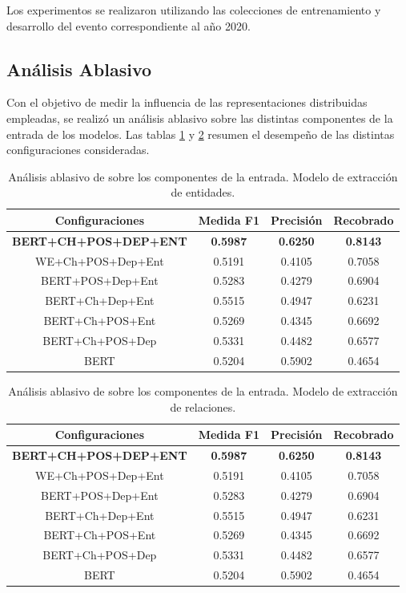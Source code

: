 Los experimentos se realizaron utilizando las colecciones de entrenamiento y desarrollo del evento correspondiente al año 2020.


\subsection{Análisis Ablasivo}

Con el objetivo de medir la influencia de las representaciones distribuidas empleadas, se realizó un análisis ablasivo sobre las distintas componentes de la entrada de los modelos.
Las tablas \ref{table:ablation_entities} y \ref{table:ablation_relations} resumen el desempeño de las distintas configuraciones consideradas.

\begin{table}[tb!]\centering	
	\begin{tabular}{|c|c|c|c|}
		\hline
		\textbf{Configuraciones} &  \textbf{Medida F1} & \textbf{Precisión} & \textbf{Recobrado} \\
		\hline
		\textbf{BERT+CH+POS+DEP+ENT} & \textbf{0.5987} & \textbf{0.6250} & \textbf{0.8143} \\
		\hline
		\hline
		WE+Ch+POS+Dep+Ent& 0.5191  & 0.4105 & 0.7058 \\
		BERT+POS+Dep+Ent & 0.5283 & 0.4279 & 0.6904 \\
		BERT+Ch+Dep+Ent & 0.5515 & 0.4947 & 0.6231 \\
		BERT+Ch+POS+Ent &	0.5269 & 0.4345 & 0.6692 \\
		BERT+Ch+POS+Dep &	0.5331 & 0.4482 & 0.6577 \\
		BERT &	0.5204 & 0.5902 & 0.4654 \\
		\hline
	\end{tabular}
	\caption{Análisis ablasivo de sobre los componentes de la entrada. Modelo de extracción de entidades.\label{table:ablation_entities}}
\end{table}

\begin{table}[tb!]\centering
	\begin{tabular}{|c|c|c|c|}
		\hline
		\textbf{Configuraciones} &  \textbf{Medida F1} & \textbf{Precisión} & \textbf{Recobrado} \\
		\hline
		\textbf{BERT+CH+POS+DEP+ENT} & \textbf{0.5987} & \textbf{0.6250} & \textbf{0.8143} \\
		\hline
		\hline
		WE+Ch+POS+Dep+Ent& 0.5191  & 0.4105 & 0.7058 \\
		BERT+POS+Dep+Ent & 0.5283 & 0.4279 & 0.6904 \\
		BERT+Ch+Dep+Ent & 0.5515 & 0.4947 & 0.6231 \\
		BERT+Ch+POS+Ent &	0.5269 & 0.4345 & 0.6692 \\
		BERT+Ch+POS+Dep &	0.5331 & 0.4482 & 0.6577 \\
		BERT &	0.5204 & 0.5902 & 0.4654 \\
		\hline
	\end{tabular}
	\caption{Análisis ablasivo de sobre los componentes de la entrada. Modelo de extracción de relaciones.\label{table:ablation_relations}}
\end{table}

